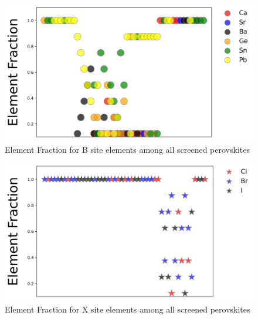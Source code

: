 \documentclass[twoside, twocolumn, 9pt, draft]{article}
\begin{document}
\begin{figure}
\centering
\includegraphics[width=.9\linewidth]{Element_BFrac.jpg}
\caption{\label{fig:sreened_frac_B} Element Fraction for B site elements among all screened perovskites}
\end{figure}

\begin{figure}
\centering
\includegraphics[width=.9\linewidth]{Element_XFrac.jpg}
\caption{\label{fig:sreened_frac_X} Element Fraction for X site elements among all screened perovskites}
\end{figure}
\end{document}
